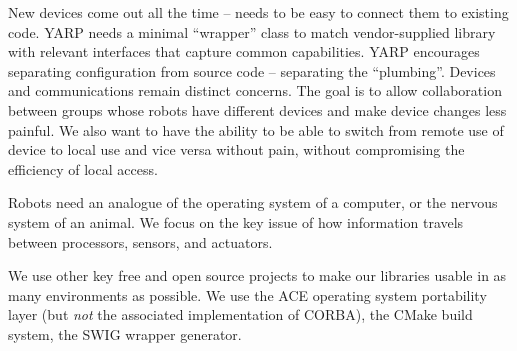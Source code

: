 





New devices come out all the time -- needs to be easy to connect them
to existing code.  YARP needs a minimal ``wrapper'' class to match
vendor-supplied library with relevant interfaces that capture common
capabilities.  YARP encourages separating configuration from source
code -- separating the ``plumbing''.  Devices and communications
remain distinct concerns.  The goal is to allow collaboration between
groups whose robots have different devices and make device changes
less painful.  We also want to have the ability to be able to switch
from remote use of device to local use and vice versa without pain,
without compromising the efficiency of local access.

Robots need an analogue of the operating system of a computer, or the
nervous system of an animal.  We focus on the key issue of how information
travels between processors, sensors, and actuators.

We use other key free and open source projects to make
our libraries usable in as many environments as possible.  We use the
ACE operating system portability layer (but {\it not} the associated
implementation of CORBA), the CMake build system, the SWIG wrapper
generator.

